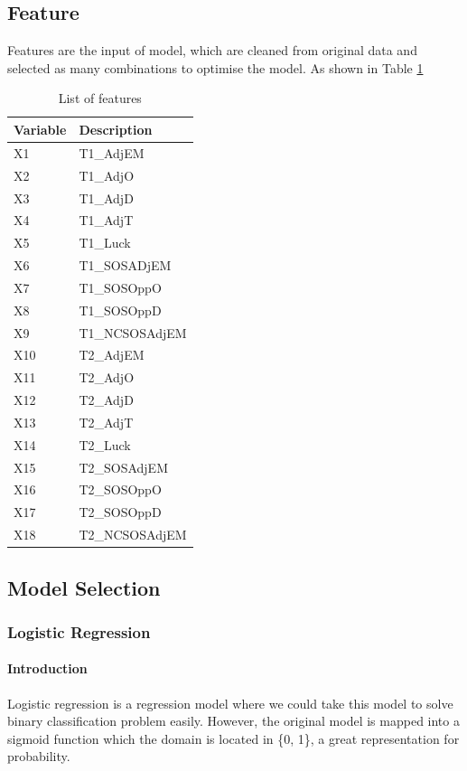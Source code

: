 \documentclass[
10pt, %
a4paper, %
oneside, %
headinclude,footinclude, %
BCOR5mm, %
]{scrartcl}
\begin{document}
\subsection{Feature}
Features are the input of model, which are cleaned from original data and selected as many combinations to optimise the model. As shown in Table \ref{my-label}
\begin{table}[H]
\centering
\caption{List of features}
\label{my-label}
\begin{tabular}{|l|l|}
\hline
\textbf{Variable} & \textbf{Description} \\ \hline
X1 & T1\_AdjEM \\ \hline
X2 & T1\_AdjO \\ \hline
X3 & T1\_AdjD \\ \hline
X4 & T1\_AdjT \\ \hline
X5 & T1\_Luck \\ \hline
X6 & T1\_SOSADjEM \\ \hline
X7 & T1\_SOSOppO \\ \hline
X8 & T1\_SOSOppD \\ \hline
X9 & T1\_NCSOSAdjEM \\ \hline
X10 & T2\_AdjEM \\ \hline
X11 & T2\_AdjO \\ \hline
X12 & T2\_AdjD \\ \hline
X13 & T2\_AdjT \\ \hline
X14 & T2\_Luck \\ \hline
X15 & T2\_SOSAdjEM \\ \hline
X16 & T2\_SOSOppO \\ \hline
X17 & T2\_SOSOppD \\ \hline
X18 & T2\_NCSOSAdjEM \\ \hline
\end{tabular}
\end{table}
\subsection{Model Selection}
\subsubsection{Logistic Regression}
\paragraph{Introduction}
Logistic regression is a regression model where we could take this model to solve binary classification problem easily. However, the original model is mapped into a sigmoid function which the domain is located in \{0, 1\}, a great representation for probability.  
\end{document}
